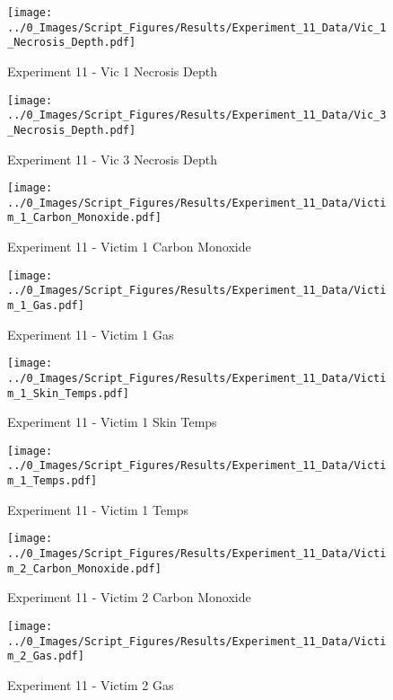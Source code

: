 	\begin{figure}[H]
		\centering
		\texttt{[image: ../0\_Images/Script\_Figures/Results/Experiment\_11\_Data/Vic\_1\_Necrosis\_Depth.pdf]}
		\caption[]{Experiment 11 - Vic 1 Necrosis Depth}
	\end{figure}
 
	\clearpage

	\begin{figure}[H]
		\centering
		\texttt{[image: ../0\_Images/Script\_Figures/Results/Experiment\_11\_Data/Vic\_3\_Necrosis\_Depth.pdf]}
		\caption[]{Experiment 11 - Vic 3 Necrosis Depth}
	\end{figure}
 

	\begin{figure}[H]
		\centering
		\texttt{[image: ../0\_Images/Script\_Figures/Results/Experiment\_11\_Data/Victim\_1\_Carbon\_Monoxide.pdf]}
		\caption[]{Experiment 11 - Victim 1 Carbon Monoxide}
	\end{figure}
 
	\clearpage

	\begin{figure}[H]
		\centering
		\texttt{[image: ../0\_Images/Script\_Figures/Results/Experiment\_11\_Data/Victim\_1\_Gas.pdf]}
		\caption[]{Experiment 11 - Victim 1 Gas}
	\end{figure}
 

	\begin{figure}[H]
		\centering
		\texttt{[image: ../0\_Images/Script\_Figures/Results/Experiment\_11\_Data/Victim\_1\_Skin\_Temps.pdf]}
		\caption[]{Experiment 11 - Victim 1 Skin Temps}
	\end{figure}
 
	\clearpage

	\begin{figure}[H]
		\centering
		\texttt{[image: ../0\_Images/Script\_Figures/Results/Experiment\_11\_Data/Victim\_1\_Temps.pdf]}
		\caption[]{Experiment 11 - Victim 1 Temps}
	\end{figure}
 

	\begin{figure}[H]
		\centering
		\texttt{[image: ../0\_Images/Script\_Figures/Results/Experiment\_11\_Data/Victim\_2\_Carbon\_Monoxide.pdf]}
		\caption[]{Experiment 11 - Victim 2 Carbon Monoxide}
	\end{figure}
 
	\clearpage

	\begin{figure}[H]
		\centering
		\texttt{[image: ../0\_Images/Script\_Figures/Results/Experiment\_11\_Data/Victim\_2\_Gas.pdf]}
		\caption[]{Experiment 11 - Victim 2 Gas}
	\end{figure}
 

